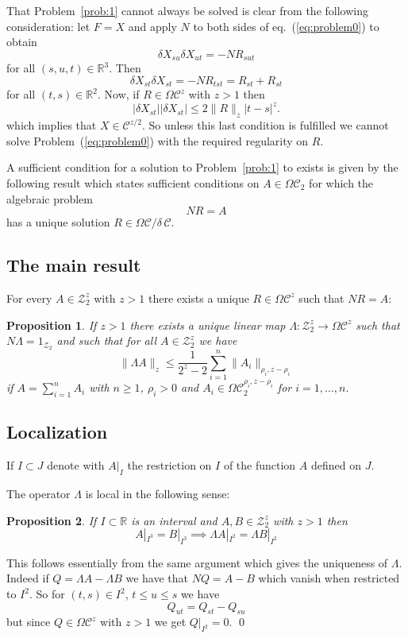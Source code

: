 \documentclass[a4paper,12pt,reqno]{amsproc}
\newcommand{\der}{\delta\!}
\newcommand{\RR}{\mathbb{R}}
\newcommand{\NN}{N}
\newcommand{\CC}{\mathcal{C}}
\newcommand{\ZZ}{\mathcal{Z}}
\newcommand{\OCC}{\Omega \mathcal{C}}
\newtheorem{proposition}{Proposition}
\begin{document}
That Problem~\ref{prob:1} cannot always be solved is clear from the following
consideration: let $F = X$ and apply $\NN$
to both sides of eq.~(\ref{eq:problem0}) to obtain
\begin{equation*}
  \der X_{su} \der X_{ut} =- \NN R_{sut}
\end{equation*}
for all $(s,u,t) \in \RR^3$. Then
\begin{equation*}
  \der X_{st} \der X_{st} =- \NN R_{tst} = R_{st}+R_{st}
\end{equation*}
for all $(t,s) \in \RR^2$. Now, if $R \in \OCC^z$ with $z > 1$ then 
\begin{equation}
\label{eq:counterex0}
  |\der X_{st}| |\der X_{st}| \le 2 \|R\|_z |t-s|^z.
\end{equation}
which implies that $X \in \CC^{z/2}$. So unless this last condition is
fulfilled we cannot solve Problem~(\ref{eq:problem0}) with the
required regularity on $R$.


A sufficient condition for a solution to Problem~\ref{prob:1} to
exists is given by the following result which states sufficient
conditions on $A \in \OCC_2$ for which the algebraic problem
$$
\NN R = A
$$
has a unique solution $R \in \OCC/\der\, \CC$.

\subsection{The main result}
For every $A \in \ZZ_2^z$ with $z > 1$ there exists a unique $R \in
\OCC^z$ such that $\NN R = A$:
\begin{proposition}
\label{prop:main}
If $z > 1$ there exists a unique linear  map $\Lambda:
\ZZ^{z}_2 \to \OCC^z$ such that $N \Lambda  = 1_{\ZZ_2}$ and
 such that for all
$A \in \ZZ^z_2$ we have 
\begin{equation*}
\|\Lambda A\|_{z} \le \frac{1}{2^z-2} \sum_{i=1}^n \|A_i\|_{\rho_i,z-\rho_i}  
\end{equation*}
if
$A = \sum_{i=1}^n A_i $ with
$n \ge 1$, 
$\rho_i > 0$ and $A_i \in \OCC_2^{\rho_i,z-\rho_i}$ for
$i=1,\dots,n$. 
\end{proposition}

\subsection{Localization}
If $I \subset J$
denote with $A|_I$ the restriction on $I$ of the function $A$ defined
on $J$.
 
The operator $\Lambda$ is local in the following sense:
\begin{proposition}
\label{prop:local}
If $I \subset \RR$ is an interval and $A,B \in \ZZ_2^z$ with $z > 1$
then
\begin{equation*}
  A |_{I^3} = B |_{I^3} \implies \Lambda A |_{I^2}= \Lambda B|_{I^2}  
\end{equation*}
\end{proposition}
\proof
This follows essentially from the same argument which gives the
uniqueness of $\Lambda$. Indeed if $Q = \Lambda A - \Lambda B$ we have that
$\NN Q = A-B $ which vanish when restricted to $I^2$. So for $(t,s) \in
I^2$, $t \le u \le s$ we have 
$$
Q_{ut}= Q_{st} - Q_{su} 
$$
but since $Q \in \OCC^z$ with $z>1$ we get $Q |_{I^2} = 0$.
\qed
\end{document}

